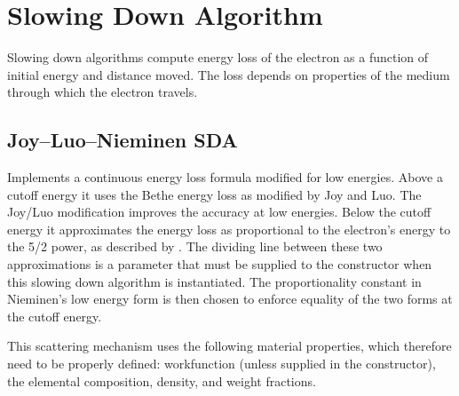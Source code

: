 \section{Slowing Down Algorithm}\label{con:sda}
Slowing down algorithms compute energy loss of the electron as a function of initial energy and distance moved. The loss depends on properties of the medium through which the electron travels. 
 
\subsection{Joy--Luo--Nieminen SDA}
Implements a continuous energy loss formula modified for low energies. Above a cutoff energy it uses the Bethe energy loss as modified by Joy and Luo. The Joy/Luo modification improves the accuracy at low energies. Below the cutoff energy it approximates the energy loss as proportional to the electron's energy to the 5/2 power, as described by \cite{Nieminen}. The dividing line between these two approximations is a parameter that must be supplied to the constructor when this slowing down algorithm is instantiated. The proportionality constant in Nieminen's low energy form is then chosen to enforce equality of the two forms at the cutoff energy. 

This scattering mechanism uses the following material properties, which therefore need to be properly defined: workfunction (unless supplied in the constructor), the elemental composition, density, and weight fractions. 
